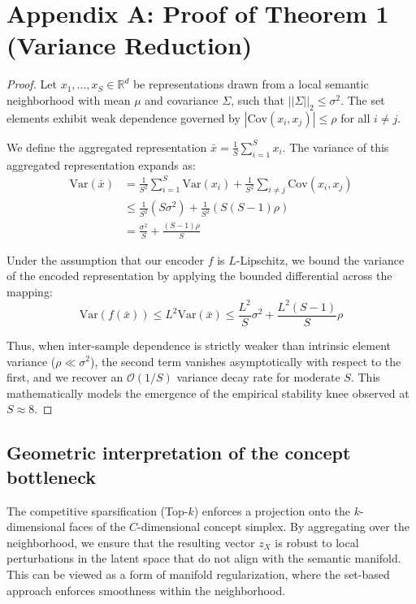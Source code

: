 \documentclass{article}
\begin{document}
\section{Appendix A: Proof of Theorem 1 (Variance Reduction)}
\label{app:proofs}
\begin{proof}
Let $x_1, \dots, x_S \in \mathbb{R}^d$ be representations drawn from a local semantic neighborhood with mean $\mu$ and covariance $\Sigma$, such that $||\Sigma||_2 \leq \sigma^2$. The set elements exhibit weak dependence governed by $|\mathrm{Cov}(x_i, x_j)| \leq \rho$ for all $i \neq j$. 

We define the aggregated representation $\bar{x} = \frac{1}{S} \sum_{i=1}^S x_i$. The variance of this aggregated representation expands as:
\begin{align}
\mathrm{Var}(\bar{x}) &= \frac{1}{S^2} \sum_{i=1}^S \mathrm{Var}(x_i) + \frac{1}{S^2} \sum_{i \neq j} \mathrm{Cov}(x_i, x_j) \\
&\leq \frac{1}{S^2} (S \sigma^2) + \frac{1}{S^2} (S(S-1) \rho) \\
&= \frac{\sigma^2}{S} + \frac{(S-1)\rho}{S}
\end{align}

Under the assumption that our encoder $f$ is $L$-Lipschitz, we bound the variance of the encoded representation by applying the bounded differential across the mapping:
\begin{equation}
\mathrm{Var}(f(\bar{x})) \leq L^2 \mathrm{Var}(\bar{x}) \leq \frac{L^2}{S} \sigma^2 + \frac{L^2 (S-1)}{S} \rho
\end{equation}

Thus, when inter-sample dependence is strictly weaker than intrinsic element variance ($\rho \ll \sigma^2$), the second term vanishes asymptotically with respect to the first, and we recover an $\mathcal{O}(1/S)$ variance decay rate for moderate $S$. This mathematically models the emergence of the empirical stability knee observed at $S \approx 8$. 

\end{proof}

\subsection{Geometric interpretation of the concept bottleneck}
The competitive sparsification (Top-$k$) enforces a projection onto the $k$-dimensional faces of the $C$-dimensional concept simplex. By aggregating over the neighborhood, we ensure that the resulting vector $z_X$ is robust to local perturbations in the latent space that do not align with the semantic manifold. This can be viewed as a form of manifold regularization, where the set-based approach enforces smoothness within the neighborhood.
\end{document}
